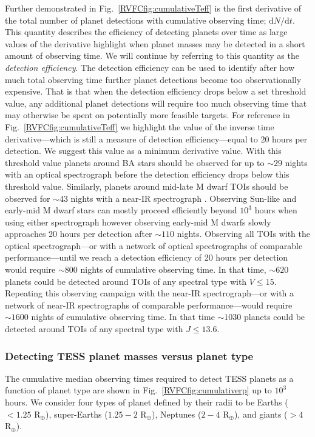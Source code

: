 Further demonstrated in Fig.~\ref{RVFCfig:cumulativeTeff} is the first derivative of the total number of
planet detections with cumulative observing time; $\text{d}N/\text{d}t$.
This quantity describes the efficiency of detecting planets over
time as large values of the derivative highlight when planet masses may be detected in a short amount of observing
time. We will continue by referring to this quantity as the \emph{detection efficiency}. The detection efficiency
can be used to identify after how much total
observing time further planet detections become too observationally expensive. That is that when the detection
efficiency drops below a set threshold value, any additional planet detections will require too much
observing time that may otherwise be spent on potentially more feasible targets.
For reference in Fig.~\ref{RVFCfig:cumulativeTeff}
we highlight the value of the inverse time derivative---which is still a measure of detection efficiency---equal
to 20 hours per detection. We suggest this value as a minimum
derivative value. With this threshold value planets around BA stars should be observed for up to $\sim 29$ nights 
with an optical spectrograph before the detection efficiency drops below this threshold value.
Similarly, planets around mid-late M dwarf TOIs should be observed for $\sim 43$ nights
with a near-IR spectrograph . Observing Sun-like and early-mid M dwarf stars can mostly proceed efficiently beyond
$10^3$ hours when using either spectrograph however observing early-mid M dwarfs slowly approaches 20 hours per
detection after $\sim 110$ nights.
Observing all TOIs with the optical spectrograph---or with a network of optical spectrographs of
comparable performance---until we reach a detection efficiency of
20 hours per detection would require $\sim 800$ nights of cumulative observing time.
In that time, $\sim 620$ planets could be detected around TOIs of any spectral type with $V \leq 15$.
Repeating this observing campaign with the near-IR
spectrograph---or with a network of near-IR spectrographs of comparable performance---would require $\sim 1600$ nights
of cumulative observing time. In that time $\sim 1030$ planets could be detected around TOIs
of any spectral type with $J \leq 13.6$.

\subsubsection{Detecting TESS planet masses versus planet type}
The cumulative median observing times required to detect TESS planets as a function of planet type 
are shown in Fig.~\ref{RVFCfig:cumulativerp} up to $10^3$ hours. We consider four types of planet defined by their radii to
be Earths ($<1.25$ R$_{\oplus}$), super-Earths ($1.25-2$ R$_{\oplus}$), Neptunes ($2-4$ R$_{\oplus}$),
and giants ($>4$ R$_{\oplus}$).

